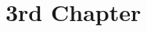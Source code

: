 \documentclass[../main.tex]{subfiles}
\begin{document}
\chapter{3rd Chapter}
\lipsum[3]
\end{document}

